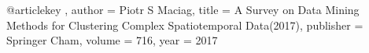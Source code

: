 @article{key ,
author = {Piotr S Maciag},
title = {A Survey on Data Mining Methods for Clustering Complex Spatiotemporal Data(2017)},
publisher = {Springer Cham},
volume = {716},
year = {2017}
}
